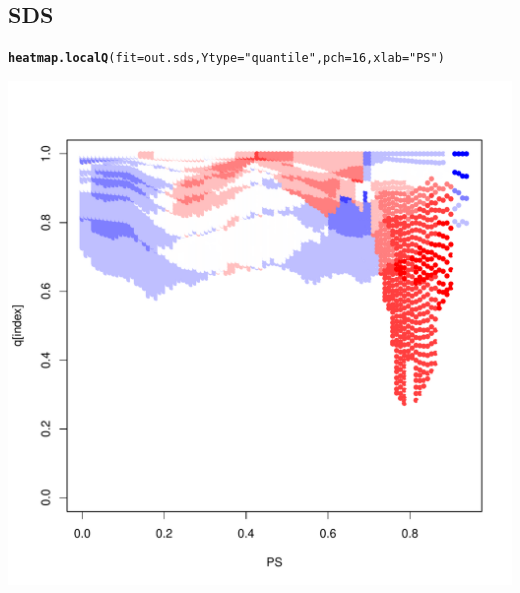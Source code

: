 \documentclass{article}\usepackage[]{graphicx}\usepackage[]{color}
\makeatletter
\def\maxwidth{ %
  \ifdim\Gin@nat@width>\linewidth
    \linewidth
  \else
    \Gin@nat@width
  \fi
}
\newcommand{\hlnum}[1]{\textcolor[rgb]{0.686,0.059,0.569}{#1}}%
\newcommand{\hlstr}[1]{\textcolor[rgb]{0.192,0.494,0.8}{#1}}%
\newcommand{\hlstd}[1]{\textcolor[rgb]{0.345,0.345,0.345}{#1}}%
\newcommand{\hlkwc}[1]{\textcolor[rgb]{0.333,0.667,0.333}{#1}}%
\newcommand{\hlkwd}[1]{\textcolor[rgb]{0.737,0.353,0.396}{\textbf{#1}}}%
\newenvironment{kframe}{%
 \def\at@end@of@kframe{}%
 \ifinner\ifhmode%
  \def\at@end@of@kframe{\end{minipage}}%
  \begin{minipage}{\columnwidth}%
 \fi\fi%
 \def\FrameCommand##1{\hskip\@totalleftmargin \hskip-\fboxsep
 \colorbox{shadecolor}{##1}\hskip-\fboxsep
     \hskip-\linewidth \hskip-\@totalleftmargin \hskip\columnwidth}%
 \MakeFramed {\advance\hsize-\width
   \@totalleftmargin\z@ \linewidth\hsize
   \@setminipage}}%
 {\par\unskip\endMakeFramed%
 \at@end@of@kframe}
\newenvironment{knitrout}{}{} %
\makeatother
\begin{document}
\subsection{SDS}
\begin{knitrout}
\color{fgcolor}\begin{kframe}
\begin{alltt}
\hlkwd{heatmap.localQ}\hlstd{(}\hlkwc{fit}\hlstd{=out.sds ,} \hlkwc{Ytype}\hlstd{=}\hlstr{"quantile"} \hlstd{,} \hlkwc{pch}\hlstd{=}\hlnum{16} \hlstd{,} \hlkwc{xlab}\hlstd{=}\hlstr{"PS"}\hlstd{)}
\end{alltt}
\end{kframe}

{\centering \includegraphics[width=\maxwidth]{figures/SDS-heatmap-1} 

}



\end{knitrout}
\end{document}
